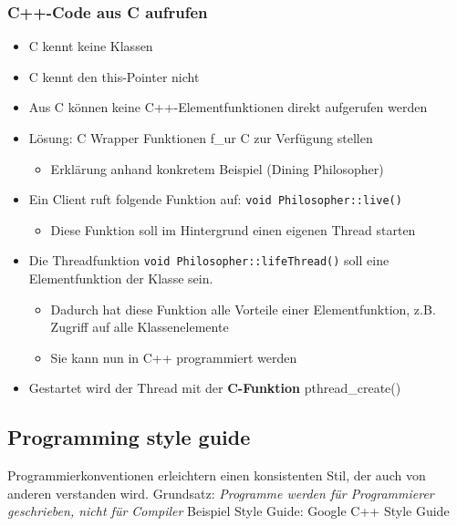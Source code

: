 \subsubsection{C++-Code aus C aufrufen}
\begin{itemize}
    \item C kennt keine Klassen
    \item C kennt den this-Pointer nicht
    \item Aus C können keine C++-Elementfunktionen direkt aufgerufen werden
    \item L\"osung: C Wrapper Funktionen f\_ur C zur Verf\"ugung stellen
    \begin{itemize}
        \item Erkl\"arung anhand konkretem Beispiel (Dining Philosopher)
    \end{itemize}
    \item Ein Client ruft folgende Funktion auf: \lstinline{void Philosopher::live()}
    \begin{itemize}
        \item Diese Funktion soll im Hintergrund einen eigenen Thread starten
    \end{itemize}
    \item Die Threadfunktion \lstinline{void Philosopher::lifeThread()} soll eine Elementfunktion der Klasse sein.
    \begin{itemize}
        \item Dadurch hat diese Funktion alle Vorteile einer Elementfunktion, z.B. Zugriff auf alle Klassenelemente
        \item Sie kann nun in C++ programmiert werden
    \end{itemize}
    \item Gestartet wird der Thread mit der \textbf{C-Funktion} pthread\_create()
\end{itemize}

\subsection{Programming style guide}
Programmierkonventionen erleichtern einen konsistenten Stil, der auch von anderen verstanden wird.
Grundsatz: \textit{Programme werden f\"ur Programmierer geschrieben, nicht f\"ur Compiler}
Beispiel Style Guide: Google C++ Style Guide

